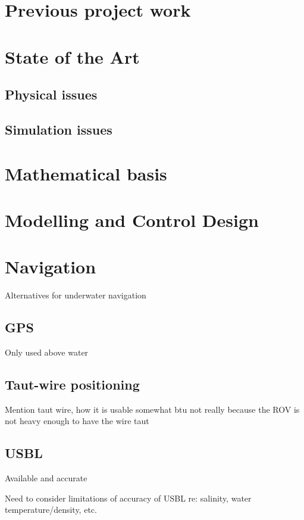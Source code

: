 \documentclass[class=article, crop=false, draft=true]{standalone}
\begin{document}
\section{Previous project work}

\section{State of the Art}
\subsection{Physical issues}
\subsection{Simulation issues}

\section{Mathematical basis}

\section{Modelling and Control Design}

\section{Navigation}
Alternatives for underwater navigation
\subsection{GPS}
Only used above water
\subsection{Taut-wire positioning}
Mention taut wire, how it is usable somewhat btu not really because the ROV is not heavy enough to have the wire taut
\subsection{USBL}
Available and accurate

Need to consider limitations of accuracy of USBL re: salinity, water temperature/density, etc.
\end{document}
